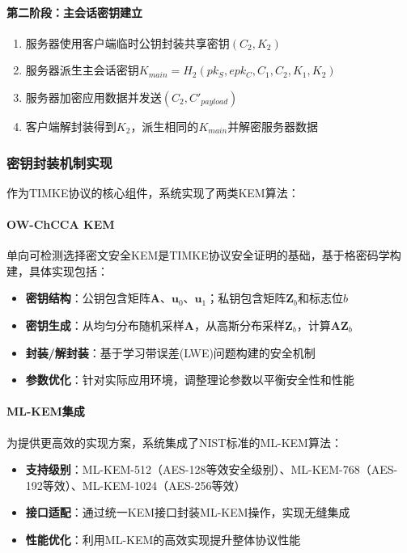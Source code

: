 \paragraph{第二阶段：主会话密钥建立}
\begin{enumerate}
    \item 服务器使用客户端临时公钥封装共享密钥$(C_2, K_2)$
    \item 服务器派生主会话密钥$K_{main} = H_2(pk_S, epk_C, C_1, C_2, K_1, K_2)$
    \item 服务器加密应用数据并发送$(C_2, C'_{payload})$
    \item 客户端解封装得到$K_2$，派生相同的$K_{main}$并解密服务器数据
\end{enumerate}

\subsubsection{密钥封装机制实现}

作为TIMKE协议的核心组件，系统实现了两类KEM算法：

\paragraph{OW-ChCCA KEM}
单向可检测选择密文安全KEM是TIMKE协议安全证明的基础，基于格密码学构建，具体实现包括：

\begin{itemize}
    \item \textbf{密钥结构}：公钥包含矩阵$\mathbf{A}$、$\mathbf{u}_0$、$\mathbf{u}_1$；私钥包含矩阵$\mathbf{Z}_b$和标志位$b$
    \item \textbf{密钥生成}：从均匀分布随机采样$\mathbf{A}$，从高斯分布采样$\mathbf{Z}_b$，计算$\mathbf{A}\mathbf{Z}_b$
    \item \textbf{封装/解封装}：基于学习带误差(LWE)问题构建的安全机制
    \item \textbf{参数优化}：针对实际应用环境，调整理论参数以平衡安全性和性能
\end{itemize}

\paragraph{ML-KEM集成}
为提供更高效的实现方案，系统集成了NIST标准的ML-KEM算法：

\begin{itemize}
    \item \textbf{支持级别}：ML-KEM-512（AES-128等效安全级别）、ML-KEM-768（AES-192等效）、ML-KEM-1024（AES-256等效）
    \item \textbf{接口适配}：通过统一KEM接口封装ML-KEM操作，实现无缝集成
    \item \textbf{性能优化}：利用ML-KEM的高效实现提升整体协议性能
\end{itemize}


